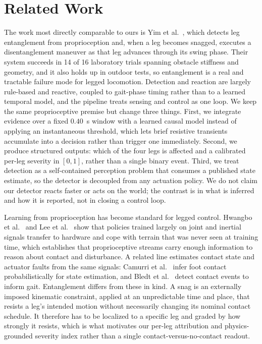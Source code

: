 \section{Related Work}

The work most directly comparable to ours is Yim et al.~\cite{yim2023entanglement}, which detects leg entanglement from proprioception and, when a leg becomes snagged, executes a disentanglement maneuver as that leg advances through its swing phase. Their system succeeds in 14 of 16 laboratory trials spanning obstacle stiffness and geometry, and it also holds up in outdoor tests, so entanglement is a real and tractable failure mode for legged locomotion. Detection and reaction are largely rule-based and reactive, coupled to gait-phase timing rather than to a learned temporal model, and the pipeline treats sensing and control as one loop. We keep the same proprioceptive premise but change three things. First, we integrate evidence over a fixed $0.40$~s window with a learned causal model instead of applying an instantaneous threshold, which lets brief resistive transients accumulate into a decision rather than trigger one immediately. Second, we produce structured outputs: which of the four legs is affected and a calibrated per-leg severity in $[0,1]$, rather than a single binary event. Third, we treat detection as a self-contained perception problem that consumes a published state estimate, so the detector is decoupled from any actuation policy. We do not claim our detector reacts faster or acts on the world; the contrast is in what is inferred and how it is reported, not in closing a control loop.

Learning from proprioception has become standard for legged control. Hwangbo et al.~\cite{hwangbo2019learning} and Lee et al.~\cite{lee2020learning} show that policies trained largely on joint and inertial signals transfer to hardware and cope with terrain that was never seen at training time, which establishes that proprioceptive streams carry enough information to reason about contact and disturbance. A related line estimates contact state and actuator faults from the same signals: Camurri et al.~\cite{camurri2017contact} infer foot contact probabilistically for state estimation, and Bledt et al.~\cite{bledt2018contact} detect contact events to inform gait. Entanglement differs from these in kind. A snag is an externally imposed kinematic constraint, applied at an unpredictable time and place, that resists a leg's intended motion without necessarily changing its nominal contact schedule. It therefore has to be localized to a specific leg and graded by how strongly it resists, which is what motivates our per-leg attribution and physics-grounded severity index rather than a single contact-versus-no-contact readout.

